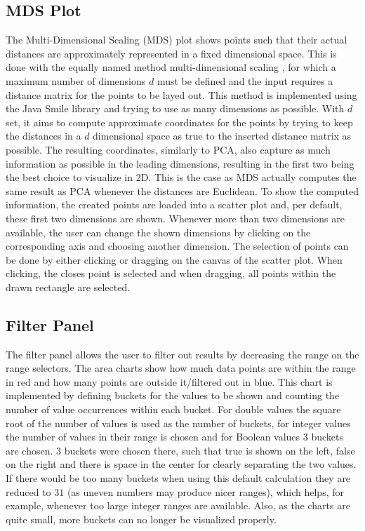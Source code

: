 \documentclass[
	a4paper,
	english,
	twoside,
	openright,               
	11pt                            
	]{report}
\begin{document}
\subsection{MDS Plot}
The Multi-Dimensional Scaling (MDS) plot shows points such that their actual distances are approximately represented in a fixed dimensional space. This is done with the equally named method multi-dimensional scaling \cite{mds}, for which a maximum number of dimensions $d$ must be defined and the input requires a distance matrix for the points to be layed out. This method is implemented using the Java Smile \cite{javasmile} library and trying to use as many dimensions as possible. With $d$ set, it aims to compute approximate coordinates for the points by trying to keep the distances in a $d$ dimensional space as true to the inserted distance matrix as possible. The resulting coordinates, similarly to PCA, also capture as much information as possible in the leading dimensions, resulting in the first two being the best choice to visualize in 2D. This is the case as MDS actually computes the same result as PCA whenever the distances are Euclidean. To show the computed information, the created points are loaded into a scatter plot and, per default, these first two dimensions are shown. Whenever more than two dimensions are available, the user can change the shown dimensions by clicking on the corresponding axis and choosing another dimension. The selection of points can be done by either clicking or dragging on the canvas of the scatter plot. When clicking, the closes point is selected and when dragging, all points within the drawn rectangle are selected.

\subsection{Filter Panel}
The filter panel allows the user to filter out results by decreasing the range on the range selectors. The area charts show how much data points are within the range in red and how many points are outside it/filtered out in blue. This chart is implemented by defining buckets for the values to be shown and counting the number of value occurrences within each bucket. For double values the square root of the number of values is used as the number of buckets, for integer values the number of values in their range is chosen and for Boolean values $3$ buckets are chosen. $3$ buckets were chosen there, such that true is shown on the left, false on the right and there is space in the center for clearly separating the two values. If there would be too many buckets when using this default calculation they are reduced to $31$ (as uneven numbers may produce nicer ranges), which helps, for example, whenever too large integer ranges are available. Also, as the charts are quite small, more buckets can no longer be visualized properly.
\end{document}
